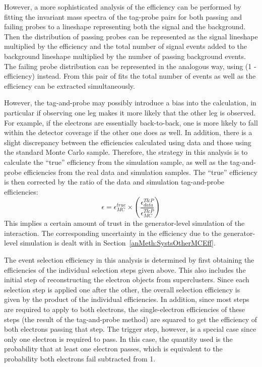 However, a more sophisticated analysis of the efficiency can 
be performed by fitting the invariant mass spectra of the
tag-probe pairs for both passing and failing probes to a 
lineshape representing both the signal and the background.  
Then the distribution of passing probes can be represented as 
the signal lineshape multiplied by the efficiency and the
total number of signal events added to the background lineshape 
multiplied by the number of passing background events.  
The failing probe distribution can be represented in the 
analogous way, using (1 - efficiency) instead.  
From this pair of fits the total number of events as well as 
the efficiency can be extracted simultaneously.  

However, the tag-and-probe may possibly introduce a bias 
into the calculation, 
in particular if observing one leg makes it more likely that 
the other leg is observed. 
For example, if the electrons are essentially back-to-back, 
one is more likely to fall within the detector coverage 
if the other one does as well.  
In addition, there is a slight discrepancy between the efficiencies 
calculated using data and those using the standard Monte Carlo sample.  
Therefore, the strategy in this analysis is to calculate the 
``true'' efficiency from the simulation sample, 
as well as the tag-and-probe efficiencies from the real data 
and simulation samples.  
The ``true'' efficiency is then corrected by the ratio of the 
data and simulation tag-and-probe efficiencies:
\[
\epsilon = \epsilon_{MC}^{true} \times \left( \frac{\epsilon_{data}^{T\&P}}{\epsilon_{MC}^{T\&P}} \right)
\]
This implies a certain amount of trust in the generator-level simulation of the interaction.  
The corresponding uncertainty in the efficiency due to the generator-level simulation 
is dealt with in 
Section~\ref{anMeth:SystsOtherMCEff}.  

The event selection efficiency in this analysis is determined 
by first obtaining the efficiencies of the individual 
selection steps given above.%
This also includes the initial step of reconstructing 
the electron objects from superclusters.  
Since each selection step is applied one after the other, 
the overall selection efficiency is given by the product 
of the individual efficiencies.  
In addition, since most steps are required to apply to both electrons, 
the single-electron efficiencies of these steps 
(the result of the tag-and-probe method)
are squared to get 
the efficiency of both electrons passing that step.  
The trigger step, however, is a special case since only one electron is 
required to pass.  
In this case, the quantity used is the probability that at least 
one electron passes, 
which is equivalent to the probability both electrons fail 
subtracted from 1.  

